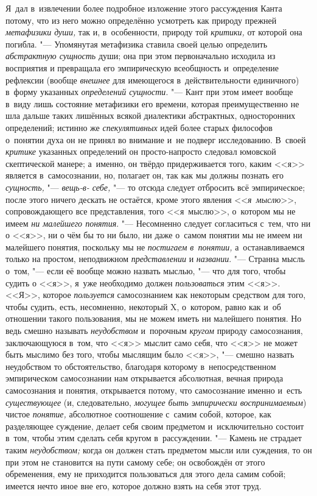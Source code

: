 Я~дал в~извлечении более подробное изложение этого рассуждения
Канта потому, что из него можно определённо усмотреть как природу прежней
{\em метафизики души,}
так и, в~особенности, природу той
{\em критики,} от которой
она погибла. "--- Упомянутая метафизика ставила своей целью
определить {\em абстрактную сущность}
души; она при этом первоначально исходила из восприятия и
превращала его эмпирическую всеобщность и~определение рефлексии (вообще
{\em внешнее} для
имеющегося в~действительности единичного) в~форму указанных
{\em определений сущности}. "---
Кант при этом имеет вообще в~виду лишь состояние метафизики
его времени, которая преимущественно не шла дальше таких лишённых всякой
диалектики абстрактных, односторонних определений; истинно же
{\em спекулятивных} идей
более старых философов о~понятии духа он не принял во внимание и~не подверг
исследованию. В~своей {\em критике}
указанных определений он просто-напросто следовал юмовской
скептической манере; а~именно, он твёрдо придерживается того, каким <<я>>
является в~самосознании, но, полагает он, так как мы должны познать его
{\em сущность,} "---
{\em вещь-в- себе,} "--- то
отсюда следует отбросить всё эмпирическое; после этого ничего дескать не
остаётся, кроме этого явления
<<{\em я~мыслю}>>,
сопровождающего все представления, того <<я~мыслю>>, о~котором
мы не имеем {\em ни малейшего понятия}.
"--- Несомненно следует согласиться с~тем, что ни о <<я>>, ни о
чём бы то ни было, ни даже о~самом понятии мы не имеем ни малейшего
понятия, поскольку мы не {\em постигаем
в~понятии,} а~останавливаемся только на простом, неподвижном
{\em представлении} и
{\em названии}. "--- Странна
мысль о~том, "--- если её вообще можно назвать мыслью, "---
что для того, чтобы судить о <<я>>, я~уже необходимо должен
{\em пользоваться} этим
<<я>>. <<Я>>, которое {\em пользуется}
самосознанием как некоторым средством для того, чтобы судить,
есть, несомненно, некоторый X, о~котором, равно как и~об отношении такого
пользования, мы не можем иметь ни малейшего понятия. Но ведь смешно
называть {\em неудобством}
и~порочным
{\em кругом}
природу самосознания, заключающуюся в~том, что <<я>> мыслит
само себя, что <<я>> не может быть мыслимо без того, чтобы мыслящим было
<<я>>, "--- смешно назвать неудобством то обстоятельство,
благодаря которому в~непосредственном эмпирическом
самосознании нам открывается абсолютная, вечная природа самосознания и
понятия, открывается потому, что самосознание именно и~есть
{\em существующее} (и,
следовательно, {\em могущее быть
эмпирически воспринимаемым}) чистое
{\em понятие,} абсолютное
соотношение с~самим собой, которое, как разделяющее суждение, делает себя
своим предметом и~исключительно состоит в~том, чтобы этим сделать себя
кругом в~рассуждении. "--- Камень не страдает таким
{\em неудобством;} когда
он должен стать предметом мысли или суждения, то он при этом не становится
на пути самому себе; он освобождён от этого обременения, ему не приходится
пользоваться для этого дела самим собой; имеется нечто иное вне его,
которое должно взять на себя этот труд.

